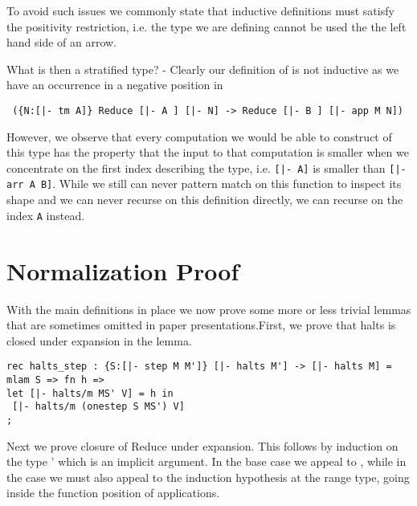 To avoid such issues we commonly state that inductive definitions must
satisfy the positivity restriction, i.e. the type we are defining
cannot be used the the left hand side of an arrow. 

What is then a stratified type? - Clearly our definition of
 is not inductive as we have an occurrence in a negative
position in 

\begin{lstlisting}
 ({N:[|- tm A]} Reduce [|- A ] [|- N] -> Reduce [|- B ] [|- app M N])  
\end{lstlisting}


However, we observe that every computation we would be able to
construct of this type has the property that the input to that
computation is smaller when we concentrate on the first index
describing the type, i.e. \lstinline![|- A]! is smaller than
\lstinline![|- arr A B]!. While we still can never
pattern match on this function to inspect its shape and we can never
recurse on this definition directly, we can recurse on the index
\lstinline!A! instead. 




\section{Normalization Proof}
With the main definitions in place we now prove some more or less trivial lemmas that are
sometimes omitted in paper presentations.First, we prove that halts is closed under expansion in the  lemma.

\begin{lstlisting}
rec halts_step : {S:[|- step M M']} [|- halts M'] -> [|- halts M] =
mlam S => fn h =>
let [|- halts/m MS' V] = h in
 [|- halts/m (onestep S MS') V]
;
\end{lstlisting}

Next we prove closure of Reduce under expansion. This follows by
induction on the type ' which is an implicit argument. In the
base case we appeal to , while in the  case
we must also appeal to the induction hypothesis at the range type,
going inside the function position of applications.

